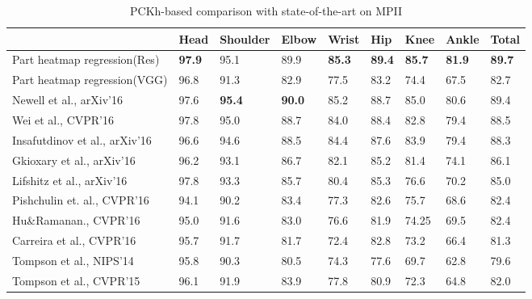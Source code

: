 \documentclass[runningheads]{llncs}
\begin{document}
\setlength{\tabcolsep}{2pt}
\begin{table}
	\begin{center}
		\caption{PCKh-based comparison with state-of-the-art on MPII}
        \label{table:MPII}
		\begin{tabular}{lllllllll}
		 &Head & Shoulder & Elbow & Wrist & Hip & Knee  & Ankle & Total \\
		 \hline
		 Part heatmap regression(Res)& \textbf{97.9}  & 95.1  & 89.9  & \textbf{85.3}  & \textbf{89.4}  & \textbf{85.7} & \textbf{81.9} & \textbf{89.7}\\
         Part heatmap regression(VGG)& 96.8  & 91.3  & 82.9  & 77.5  & 83.2  & 74.4 & 67.5 & 82.7\\
         \hline
        Newell et al., arXiv'16 \cite{newell2016stacked} & 97.6 & \textbf{95.4} & \textbf{90.0} & 85.2 & 88.7 & 85.0 & 80.6 & 89.4 \\
        Wei et al., CVPR'16 \cite{wei2016convolutional} & 97.8 & 95.0 & 88.7 & 84.0 & 88.4 & 82.8 & 79.4 & 88.5 \\
        Insafutdinov et al., arXiv'16 \cite{insafutdinov2016deepercut} & 96.6 & 94.6 & 88.5 & 84.4 & 87.6 & 83.9 & 79.4 & 88.3 \\
        Gkioxary et al., arXiv'16 \cite{gkioxari2016chained} & 96.2 & 93.1 & 86.7 & 82.1 & 85.2 & 81.4 & 74.1 & 86.1 \\
        Lifshitz et al., arXiv'16 \cite{lifshitz2016human} & 97.8 & 93.3 & 85.7 & 80.4 & 85.3 & 76.6 & 70.2 & 85.0 \\
        Pishchulin et. al., CVPR'16 \cite{pishchulin2015deepcut} & 94.1 & 90.2 & 83.4 & 77.3 & 82.6 & 75.7 & 68.6 & 82.4 \\
        Hu\&Ramanan., CVPR'16 \cite{hu2015bottom}  & 95.0 & 91.6 & 83.0 & 76.6 & 81.9 & 74.25 & 69.5 & 82.4 \\
        Carreira et al., CVPR'16 \cite{carreira2015human}& 95.7 & 91.7 & 81.7 & 72.4 & 82.8 & 73.2 & 66.4 & 81.3 \\
		 Tompson et al., NIPS'14 \cite{tompson2014joint} & 95.8  & 90.3  & 80.5  & 74.3  & 77.6  & 69.7 & 62.8 & 79.6\\
		 Tompson et al., CVPR'15 \cite{tompson2015efficient} & 96.1  & 91.9  & 83.9  & 77.8  & 80.9  & 72.3 & 64.8 & 82.0 \\
			\hline
		\end{tabular}
	\end{center}
\end{table}
\setlength{\tabcolsep}{1.4pt}
\end{document}
